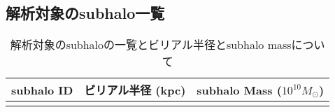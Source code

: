 \documentclass[main.tex]{subfiles}
\begin{document}
	\appendix
	\chapter{}
	\section{解析対象のsubhalo一覧}
	
	\begin{longtable}{ccc}
		
		\caption{解析対象のsubhaloの一覧とビリアル半径とsubhalo massについて} \label{tab:virialtable} \\
		\toprule
		subhalo ID & ビリアル半径 (\si{kpc}) & subhalo Mass ($10^{10} M_\odot$)\\
		\midrule
		\endhead
		
		\bottomrule
		\endfoot
		

\end{longtable}
\end{document}
